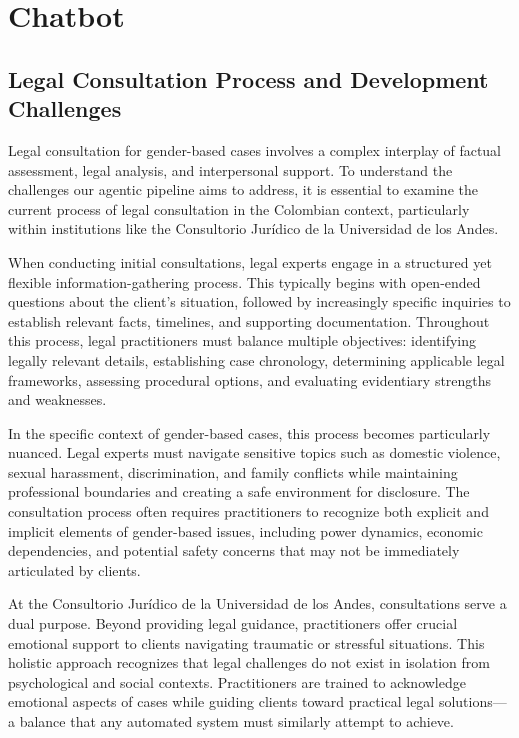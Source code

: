 \chapter{Chatbot}
\section{Legal Consultation Process and Development Challenges}
Legal consultation for gender-based cases involves a complex interplay of factual assessment, 
legal analysis, and interpersonal support. To understand the challenges our agentic pipeline 
aims to address, it is essential to examine the current process of legal consultation in the 
Colombian context, particularly within institutions like the Consultorio Jurídico de la Universidad de los Andes.

When conducting initial consultations, legal experts engage in a structured yet flexible 
information-gathering process. This typically begins with open-ended questions about the 
client's situation, followed by increasingly specific inquiries to establish relevant facts, 
timelines, and supporting documentation. Throughout this process, legal practitioners must 
balance multiple objectives: identifying legally relevant details, establishing case chronology, 
determining applicable legal frameworks, assessing procedural options, and evaluating evidentiary 
strengths and weaknesses.

In the specific context of gender-based cases, this process becomes particularly nuanced. 
Legal experts must navigate sensitive topics such as domestic violence, sexual harassment, 
discrimination, and family conflicts while maintaining professional boundaries and creating 
a safe environment for disclosure. The consultation process often requires practitioners to 
recognize both explicit and implicit elements of gender-based issues, including power dynamics, 
economic dependencies, and potential safety concerns that may not be immediately articulated by clients.

At the Consultorio Jurídico de la Universidad de los Andes, consultations serve a dual purpose. 
Beyond providing legal guidance, practitioners offer crucial emotional support to clients navigating 
traumatic or stressful situations. This holistic approach recognizes that legal challenges do 
not exist in isolation from psychological and social contexts. Practitioners are trained to 
acknowledge emotional aspects of cases while guiding clients toward practical legal 
solutions—a balance that any automated system must similarly attempt to achieve.

